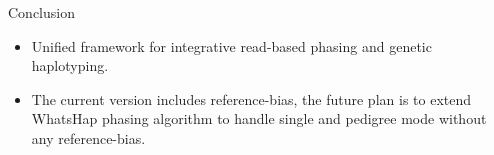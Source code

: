\documentclass[notes=hide]{beamer}
\newcommand{\captionslide}[1]{
\begin{frame}
\frametitle{\phantom{NONE}}
\begin{center}
\vspace{1cm}
\usebeamerfont{Largefont}
          {\bf\em #1}
          \vspace{2cm}
\end{center}
\end{frame}
}
\begin{document}
\begin{frame}{Conclusion}
	\begin{itemize}
		\item Unified framework for integrative read-based phasing and genetic haplotyping.
		\item The current version includes reference-bias, the future plan is to extend WhatsHap phasing algorithm to handle single and pedigree mode without any reference-bias. 
	\end{itemize}
\end{frame}

% 
\end{document}
